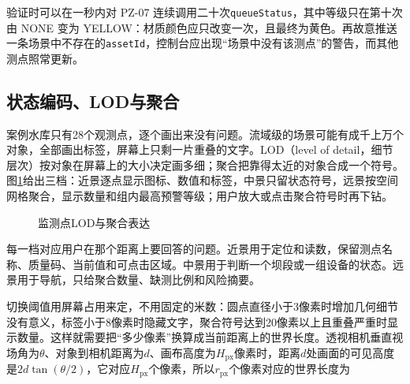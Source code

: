 验证时可以在一秒内对 PZ-07 连续调用二十次\texttt{queueStatus}，其中等级只在第十次由 NONE 变为 YELLOW：材质颜色应只改变一次，且最终为黄色。再故意推送一条场景中不存在的\texttt{assetId}，控制台应出现“场景中没有该测点”的警告，而其他测点照常更新。

\subsection{状态编码、LOD与聚合}

案例水库只有28个观测点，逐个画出来没有问题。流域级的场景可能有成千上万个对象，全部画出标签，屏幕上只剩一片重叠的文字。LOD（level of detail，细节层次）按对象在屏幕上的大小决定画多细；聚合把靠得太近的对象合成一个符号。图\ref{fig:lod-cluster}给出三档：近景逐点显示图标、数值和标签，中景只留状态符号，远景按空间网格聚合，显示数量和组内最高预警等级；用户放大或点击聚合符号时再下钻。

\begin{figure}[htbp]
\centering
{}
\caption{监测点LOD与聚合表达}
\label{fig:lod-cluster}
\end{figure}

每一档对应用户在那个距离上要回答的问题。近景用于定位和读数，保留测点名称、质量码、当前值和可点击区域。中景用于判断一个坝段或一组设备的状态。远景用于导航，只给聚合数量、缺测比例和风险摘要。

切换阈值用屏幕占用来定，不用固定的米数：圆点直径小于3像素时增加几何细节没有意义，标签小于8像素时隐藏文字，聚合符号达到20像素以上且重叠严重时显示数量。这样就需要把“多少像素”换算成当前距离上的世界长度。透视相机垂直视场角为$\theta$、对象到相机距离为$d$、画布高度为$H_{\mathrm{px}}$像素时，距离$d$处画面的可见高度是$2d\tan(\theta/2)$，它对应$H_{\mathrm{px}}$个像素，所以$r_{\mathrm{px}}$个像素对应的世界长度为

